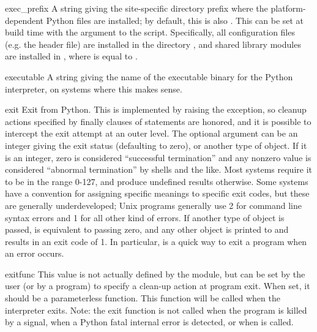 \begin{datadesc}{exec_prefix}
A string giving the site-specific directory prefix where the
platform-dependent Python files are installed; by default, this is
also .  This can be set at build time with the
\programopt{-} argument to the
 script.  Specifically, all configuration files
(e.g. the  header file) are installed in the directory
, and shared
library modules are installed in , where  is equal
to .
\end{datadesc}

\begin{datadesc}{executable}
A string giving the name of the executable binary for the Python
interpreter, on systems where this makes sense.
\end{datadesc}

\begin{funcdesc}{exit}{}
Exit from Python.  This is implemented by raising the
 exception, so cleanup actions specified by
finally clauses of  statements are honored, and it is
possible to intercept the exit attempt at an outer level.  The
optional argument  can be an integer giving the exit status
(defaulting to zero), or another type of object.  If it is an integer,
zero is considered ``successful termination'' and any nonzero value is
considered ``abnormal termination'' by shells and the like.  Most
systems require it to be in the range 0-127, and produce undefined
results otherwise.  Some systems have a convention for assigning
specific meanings to specific exit codes, but these are generally
underdeveloped; Unix programs generally use 2 for command line syntax
errors and 1 for all other kind of errors.  If another type of object
is passed,  is equivalent to passing zero, and any other
object is printed to  and results in an exit code of
1.  In particular,  is a quick
way to exit a program when an error occurs.
\end{funcdesc}

\begin{datadesc}{exitfunc}
  This value is not actually defined by the module, but can be set by
  the user (or by a program) to specify a clean-up action at program
  exit.  When set, it should be a parameterless function.  This function
  will be called when the interpreter exits.  Note: the exit function
  is not called when the program is killed by a signal, when a Python
  fatal internal error is detected, or when  is called.
\end{datadesc}


